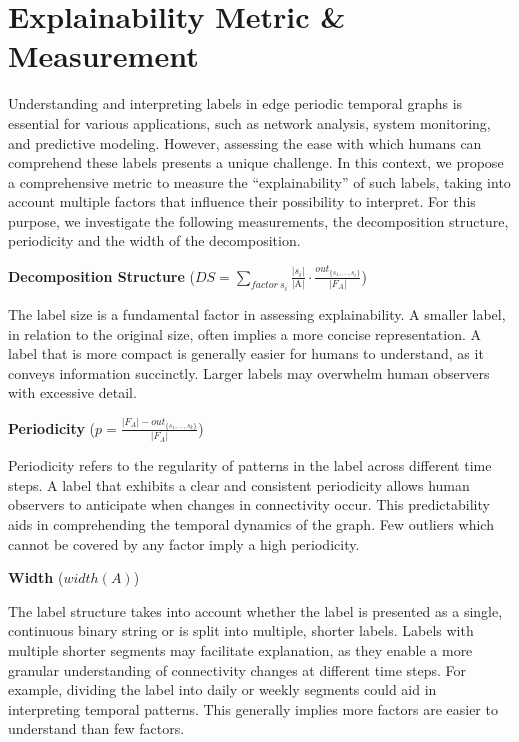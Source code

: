 \chapter{Explainability Metric \& Measurement}

Understanding and interpreting labels in edge periodic temporal graphs is essential for various applications, such as network analysis, system monitoring, and predictive modeling. However, assessing the ease with which humans can comprehend these labels presents a unique challenge. In this context, we propose a comprehensive metric to measure the \enquote{explainability} of such labels, taking into account multiple factors that influence their possibility to interpret. For this purpose, we investigate the following measurements, the decomposition structure, periodicity and the width of the decomposition.

\textbf{Decomposition Structure} ($DS = \sum\limits_{factor~ s_i}\frac{|s_i|}{\text{|A|}} \cdot \frac{out_{\{s_1,\dots,s_i\}}}{|F_A|}$)

The label size is a fundamental factor in assessing explainability. A smaller label, in relation to the original size, often implies a more concise representation. A label that is more compact is generally easier for humans to understand, as it conveys information succinctly. Larger labels may overwhelm human observers with excessive detail.

\textbf{Periodicity} ($p = \frac{|F_A| - out_{\{s_1,\dots,s_k\}}}{|F_A|}$)

Periodicity refers to the regularity of patterns in the label across different time steps. A label that exhibits a clear and consistent periodicity allows human observers to anticipate when changes in connectivity occur. This predictability aids in comprehending the temporal dynamics of the graph. Few outliers which cannot be covered by any factor imply a high periodicity.

\textbf{Width} ($width(A)$)

The label structure takes into account whether the label is presented as a single, continuous binary string or is split into multiple, shorter labels. Labels with multiple shorter segments may facilitate explanation, as they enable a more granular understanding of connectivity changes at different time steps. For example, dividing the label into daily or weekly segments could aid in interpreting temporal patterns. This generally implies more factors are easier to understand than few factors.


